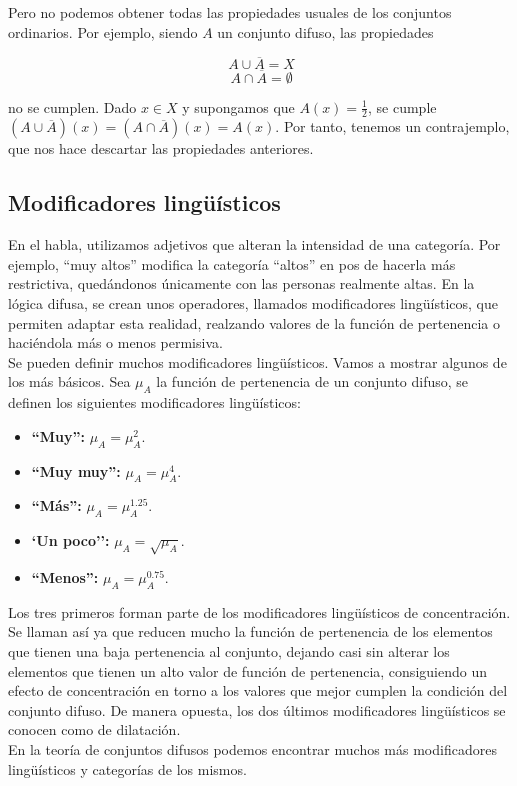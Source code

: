 Pero no podemos obtener todas las propiedades usuales de los conjuntos ordinarios. Por ejemplo, siendo $A$ un conjunto difuso, las propiedades

\[
\ A \cup \overline{A} = X
\]
\[
\ A \cap \overline{A} = \emptyset
\]

no se cumplen. Dado $x \in X$ y supongamos que $A(x)=\frac{1}{2}$, se cumple $\left( A \cup \overline{A} \right) (x) = \left( A \cap \overline{A} \right) (x) = A(x)$. Por tanto, tenemos un contrajemplo, que nos hace descartar las propiedades anteriores.\\

\subsection{Modificadores lingüísticos}

En el habla, utilizamos adjetivos que alteran la intensidad de una categoría. Por ejemplo, ``muy altos'' modifica la categoría ``altos'' en pos de hacerla más restrictiva, quedándonos únicamente con las personas realmente altas. En la lógica difusa, se crean unos operadores, llamados modificadores lingüísticos, que permiten adaptar esta realidad, realzando valores de la función de pertenencia o haciéndola más o menos permisiva.\\

Se pueden definir muchos modificadores lingüísticos. Vamos a mostrar algunos de los más básicos. Sea $\mu_A$ la función de pertenencia de un conjunto difuso, se definen los siguientes modificadores lingüísticos:

\begin{itemize}
\item \textbf{``Muy'': }$\mu_A = \mu_A^2$.
\item \textbf{``Muy muy'': }$\mu_A = \mu_A^4$.
\item \textbf{``Más'': }$\mu_A = \mu_A^{1.25}$.
\item \textbf{`Un poco'': }$\mu_A = \sqrt{\mu_A}$.
\item \textbf{``Menos'': }$\mu_A = \mu_A^{0.75}$.
\end{itemize}

Los tres primeros forman parte de los modificadores lingüísticos de concentración. Se llaman así ya que reducen mucho la función de pertenencia de los elementos que tienen una baja pertenencia al conjunto, dejando casi sin alterar los elementos que tienen un alto valor de función de pertenencia, consiguiendo un efecto de concentración en torno a los valores que mejor cumplen la condición del conjunto difuso. De manera opuesta, los dos últimos modificadores lingüísticos se conocen como de dilatación.\\

En la teoría de conjuntos difusos podemos encontrar muchos más modificadores lingüísticos y categorías de los mismos.\\
